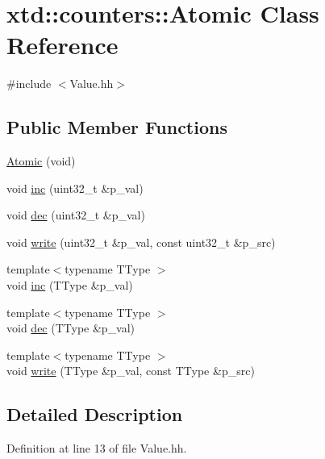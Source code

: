 \hypertarget{classxtd_1_1counters_1_1Atomic}{\section{xtd\-:\-:counters\-:\-:Atomic Class Reference}
\label{classxtd_1_1counters_1_1Atomic}
}


{\ttfamily \#include $<$Value.\-hh$>$}

\subsection*{Public Member Functions}
\begin{DoxyCompactItemize}
\item 
\hyperlink{classxtd_1_1counters_1_1Atomic_a54a3a8f1a29283e78a495fdd410fc3c4}{Atomic} (void)
\item 
void \hyperlink{classxtd_1_1counters_1_1Atomic_a88c5f887b5d7b70f1da87b393f12bccc}{inc} (uint32\-\_\-t \&p\-\_\-val)
\item 
void \hyperlink{classxtd_1_1counters_1_1Atomic_adb613d1d33a70c6e17d1896058a110fe}{dec} (uint32\-\_\-t \&p\-\_\-val)
\item 
void \hyperlink{classxtd_1_1counters_1_1Atomic_a90c6aa9ad58612b867df2bbdc779ca3b}{write} (uint32\-\_\-t \&p\-\_\-val, const uint32\-\_\-t \&p\-\_\-src)
\item 
{\footnotesize template$<$typename T\-Type $>$ }\\void \hyperlink{classxtd_1_1counters_1_1Atomic_adf3283f7fc1cf51af28ea2aa5822f272}{inc} (T\-Type \&p\-\_\-val)
\item 
{\footnotesize template$<$typename T\-Type $>$ }\\void \hyperlink{classxtd_1_1counters_1_1Atomic_a2bf93bdc52005c846ac43bb2afcac8f5}{dec} (T\-Type \&p\-\_\-val)
\item 
{\footnotesize template$<$typename T\-Type $>$ }\\void \hyperlink{classxtd_1_1counters_1_1Atomic_a53755a00d69b11274593f62737d9a54a}{write} (T\-Type \&p\-\_\-val, const T\-Type \&p\-\_\-src)
\end{DoxyCompactItemize}


\subsection{Detailed Description}


Definition at line 13 of file Value.\-hh.



